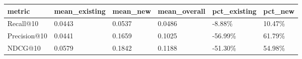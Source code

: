 \begin{tabular}{llllll}
\toprule
metric & mean_existing & mean_new & mean_overall & pct_existing & pct_new \\
\midrule
Recall@10 & 0.0443 & 0.0537 & 0.0486 & -8.88\% & 10.47\% \\
Precision@10 & 0.0441 & 0.1659 & 0.1025 & -56.99\% & 61.79\% \\
NDCG@10 & 0.0579 & 0.1842 & 0.1188 & -51.30\% & 54.98\% \\
\bottomrule
\end{tabular}
